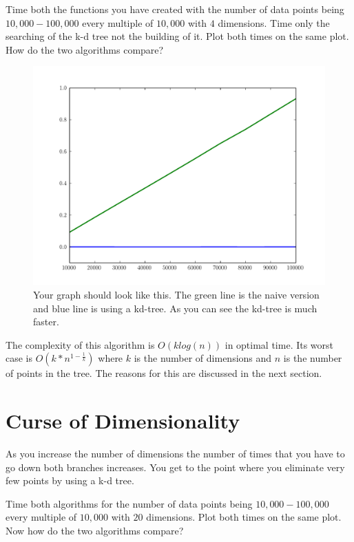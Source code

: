 \begin{problem}
Time both the functions you have created with the number of data points being $10,000-100,000$ every multiple of $10,000$ with $4$ dimensions.
Time only the searching of the k-d tree not the building of it.
Plot both times on the same plot.
How do the two algorithms compare?


\begin{figure}[H]
\includegraphics[width=\textwidth]{fourDTime.pdf}
\caption{Your graph should look like this.
The green line is the naive version and blue line is using a kd-tree.
As you can see the kd-tree is much faster.}
\label{fig:fourDTime}
\end{figure}
\end{problem}

The complexity of this algorithm is $O(klog(n))$ in optimal time.
Its worst case is $O(k*n^{1-\frac{1}{k}})$ where $k$ is the number of dimensions and $n$ is the number of points in the tree.
The reasons for this are discussed in the next section.

\section*{Curse of Dimensionality}

As you increase the number of dimensions the number of times that you have to go down both branches increases.
You get to the point where you eliminate very few points by using a k-d tree.

\begin{problem}
Time both algorithms for the number of data points being $10,000-100,000$ every multiple of $10,000$ with $20$ dimensions.
Plot both times on the same plot. Now how do the two algorithms compare?
\end{problem}

